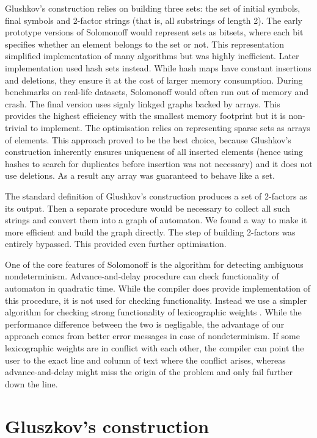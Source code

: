 Glushkov's construction relies on building three sets: the set of initial symbols, final symbols and 2-factor \cite{GLUSHKOV} strings (that is, all substrings of length 2). The early prototype versions of Solomonoff would represent sets as bitsets, where each bit specifies whether an element belongs to the set or not. This representation simplified implementation of many algorithms but was highly inefficient. Later implementation used hash sets instead. While hash maps have constant insertions and deletions, they ensure it at the cost of larger memory consumption. During benchmarks on real-life datasets, Solomonoff would often run out of memory and crash.  The final version uses signly linkged graphs backed by arrays. This provides the highest efficiency with the smallest memory footprint but it is non-trivial to implement. The optimisation relies on representing sparse sets as arrays of elements. This approach proved to be the best choice, because Glushkov's construction inherently ensures uniqueness of all inserted elements (hence using hashes to search for duplicates before insertion was not necessary)  and it does not use deletions. As a result any array was guaranteed to behave like a set.

The standard definition of Glushkov's construction produces a set of 2-factors as its output. Then a separate procedure would be necessary to collect all such strings and convert them into a graph of automaton. We found a way to make it more efficient and build the graph directly. The step of building 2-factors was entirely bypassed. This provided even further optimisation.

One of the core features of Solomonoff is the algorithm for detecting ambiguous nondeterminism. Advance-and-delay procedure can check functionality of automaton in quadratic time. While the compiler does provide implementation of this procedure, it is not used for checking functionality. Instead we use a simpler algorithm for checking strong functionality of lexicographic weights \cite{MendozaDrosik2020MultitapeAA}. While the performance difference between the two is negligable, the advantage of our approach comes from  better error messages in case of nondeterminism. If some lexicographic weights are in conflict with each other, the compiler can point the user to the exact line and column of text where the conflict arises, whereas advance-and-delay might miss the origin of the problem and only fail further down the line.

\section{Gluszkov's construction}



